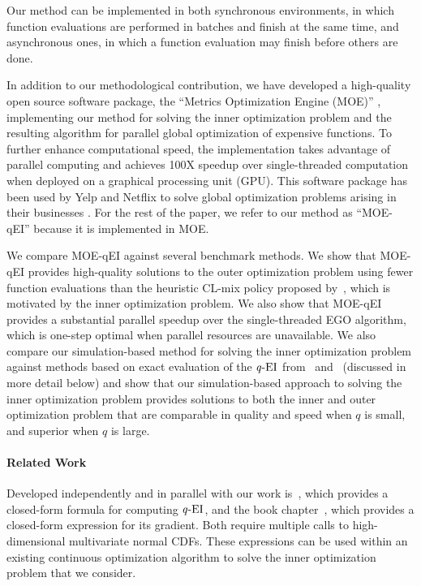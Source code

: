 \documentclass[paper=letter]{scrartcl}
\newcommand{\qEI}{\text{\textit q-EI}}
\begin{document}
Our method can be implemented in both synchronous environments, in which function evaluations are performed in batches and finish at the same time, and asynchronous ones, in which a function evaluation may finish before others are done.

In addition to our methodological contribution, we have 
developed a high-quality open source software package, the ``Metrics Optimization Engine (MOE)'' \citep{moe-github2015},
implementing our method for solving the inner optimization problem and the 
resulting algorithm for parallel global optimization of expensive functions. 
To further enhance computational speed, the implementation takes advantage of
parallel computing and achieves 100X speedup over single-threaded computation when deployed on a graphical processing unit (GPU).
This software package has been used by Yelp and Netflix to solve global optimization problems arising in their businesses \citep{YelpBlog2014,NetflixMLConf2014}.
For the rest of the paper, we refer to our method as \enquote{MOE-qEI} because it is  implemented in MOE.

We compare MOE-qEI against several benchmark methods.  We show that MOE-qEI provides high-quality solutions to the outer optimization problem using fewer function evaluations than the heuristic CL-mix policy proposed by~\cite{chevalier2013fast}, which is motivated by the inner optimization problem.  We also show that MOE-qEI provides a substantial parallel speedup over the single-threaded EGO algorithm, which is one-step optimal when parallel resources are unavailable.
We also compare our simulation-based method for solving the inner optimization problem against methods based on exact evaluation of the $\qEI$ from~\cite{chevalier2013fast} and~\cite{marmin2015differentiating} (discussed in more detail below) and show that our simulation-based approach to solving the inner optimization problem provides solutions to both the inner and outer optimization problem that are comparable in quality and speed when $q$ is small, and superior when $q$ is large.


\paragraph{Related Work}
Developed independently and in parallel with our work is~\cite{chevalier2013fast}, which provides a closed-form formula for computing $\qEI$, and the book chapter~\cite{marmin2015differentiating}, which provides a closed-form expression for its gradient.  Both require multiple calls to high-dimensional multivariate normal CDFs.  These expressions can be used within an existing continuous optimization algorithm to solve the inner optimization problem that we consider.
\end{document}
